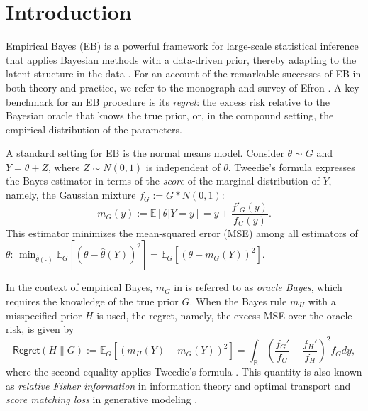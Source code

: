\documentclass[letterpaper,11pt]{article}
\newcommand{\reals}{\mathbb{R}}
\newcommand{\Expect}{\mathbb{E}}
\newcommand{\pth}[1]{\left( #1 \right)}
\theoremstyle{definition}
\newcommand{\Regret}{\mathsf{Regret}}
\renewcommand{\hat}{\widehat}
\begin{document}
\section{Introduction}

Empirical Bayes (EB) is a powerful framework for large-scale statistical inference that applies Bayesian methods with a data-driven prior, thereby adapting to the latent structure in the data \cite{robbins1956empirical,zhang2003compound}. For an account of the remarkable successes of EB in both theory and practice, we refer to the monograph and survey of Efron \cite{efron2012large,efron2024empirical}. A key benchmark for an EB procedure is its \textit{regret}: the excess risk relative to the Bayesian oracle that knows the true prior, or, in the compound setting, the empirical distribution of the parameters.

A standard setting for EB is the normal means model. 
Consider $\theta \sim G$ and $Y=\theta+Z$, where $Z\sim N(0,1)$ is independent of $\theta$. Tweedie's formula expresses the Bayes estimator in terms of the \textit{score} of the 
marginal distribution of $Y$, namely, the Gaussian mixture $f_G := G * N(0,1)$:
    \begin{equation}
      m_G(y) := \Expect[\theta|Y=y]  = y + \frac{f'_G(y)}{f_G(y)}.
      \label{eq:tweedie}
    \end{equation}
    This estimator minimizes the mean-squared error (MSE) among all estimators of $\theta$: 
$\min_{\hat\theta(\cdot)} \Expect_G[(\theta-\hat\theta(Y))^2] = 
\Expect_G[(\theta-m_G(Y))^2]$.

  
In the context of empirical Bayes, $m_G$ in  is referred to as \textit{oracle Bayes}, which requires the knowledge of the true prior $G$. 
When 
the Bayes rule $m_H$ with  a misspecified prior $H$ is used, the regret, namely,  the excess 
MSE over the oracle risk, is given by
\begin{equation}
\Regret(H\|G) := 
\Expect_G[(m_H(Y)-m_G(Y))^2] 
= 
\int_{\reals} \pth{\frac{f_G'}{f_G}-\frac{f_H'}{f_H}}^2 f_G dy,
\label{eq:regret}
\end{equation}
where the second equality applies Tweedie's formula .
This quantity is also known as \textit{relative Fisher information} 
in information theory and optimal transport \cite{villani.topics,raginsky2013concentration} and  \textit{score matching loss} in generative modeling \cite{hyvarinen2005estimation}.
\end{document}
